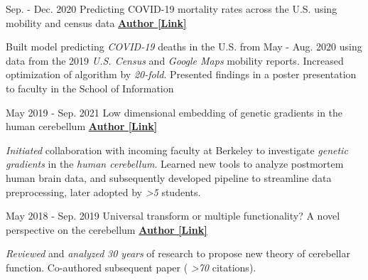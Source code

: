 \begin{cventries}
    
    
 \cventry
   {Sep. - Dec. 2020} %
   {Predicting COVID-19 mortality rates across the U.S. using mobility and census data} %
    {\href{https://drive.google.com/file/d/1l9TLGLmstkJsvOJQPxHe_f35b4fEkDU4/view}{\textbf{Author [Link]}}}
    {}
    {
      \begin{cvitems} %
      	\item {Built model predicting \textit{COVID-19} deaths in the U.S. from May - Aug. 2020 using data from the 2019 \textit{U.S. Census} and \textit{Google Maps} mobility reports. Increased optimization of algorithm by \textit{20-fold}. Presented findings in a poster presentation to faculty in the School of Information}
      \end{cvitems}
    }
    
  \cventry
    {May 2019 - Sep. 2021} %
    {Low dimensional embedding of genetic gradients in the human cerebellum} %
    {\href{https://papers.ssrn.com/sol3/papers.cfm?abstract_id=3797269}{\textbf{Author [Link]}}}
    {}
    {
      \begin{cvitems} %
      	\item {\textit{Initiated} collaboration with incoming faculty at Berkeley to investigate \textit{genetic gradients} in the \textit{human cerebellum}. Learned new tools to analyze postmortem human brain data, and subsequently developed pipeline to streamline data preprocessing, later adopted by \textit{>5} students.}
      \end{cvitems}
    }
    
  \cventry
    {May 2018 - Sep. 2019} %
    {Universal transform or multiple functionality? A novel perspective on the cerebellum} %
    {\href{https://www.sciencedirect.com/science/article/pii/S0896627319303782}{\textbf{Author [Link]}}}
    {}
    {
      \begin{cvitems} %
      	\item {\textit{Reviewed} and \textit{analyzed} \textit{30 years} of research to propose new theory of cerebellar function. Co-authored subsequent paper ( \textit{>70} citations).}
      \end{cvitems}
    }
 
\end{cventries}